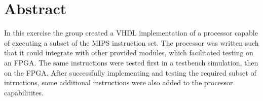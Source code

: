 \chapter*{Abstract}

In this exercise the group created a VHDL implementation of a processor capable of executing a subset of the MIPS instruction set.
The processor was written such that it could integrate with other provided modules,
which facilitated testing on an FPGA.
The same instructions were tested first in a testbench simulation,
then on the FPGA.
After successfully implementing and testing the required subset of intructions,
some additional instructions were also added to the processor capabilitites.
